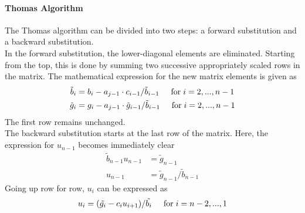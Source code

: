 \documentclass[%
oneside,                 %
final,                   %
10pt]{article}
\begin{document}
\paragraph{Thomas Algorithm}
The Thomas algorithm can be divided into two steps: a forward substitution and a backward substitution.\\
In the forward substitution, the lower-diagonal elements are eliminated. Starting from the top, this is done by summing two successive appropriately scaled rows in the matrix. The mathematical expression for the new matrix elements is given as
\begin{equation*}
\begin{aligned}
\tilde{b}_i &= b_i - a_{j-1} \cdot c_{i-1}/ \tilde{b}_{i-1}  \hspace{0.5cm} \mathrm{for} \hspace{0.1cm} i=2,..., n-1 \\
\tilde{g}_i &= g_i - a_{j-1} \cdot \tilde{g}_{i-1} / \tilde{b}_{i-1}  \hspace{0.5cm} \mathrm{for} \hspace{0.1cm} i=2,..., n-1
\end{aligned}
\end{equation*}
The first row remains unchanged. \\
The backward substitution starts at the last row of the matrix. Here, the expression for $u_{n-1}$ becomes immediately clear
\begin{equation*}
\begin{aligned}
\tilde{b}_{n-1} u_{n-1} &= \tilde{g}_{n-1} \\
u_{n-1} &= \tilde{g}_{n-1} / \tilde{b}_{n-1}
\end{aligned}
\end{equation*}
Going up row for row, $u_i$ can be expressed as
\begin{equation*}
u_i = ( \tilde{g_i}-c_i u_{i+1} )/ \tilde{b_i} \hspace{0.5cm} \mathrm{for} \hspace{0.1cm} i=n-2,...,1
\end{equation*}
\end{document}
